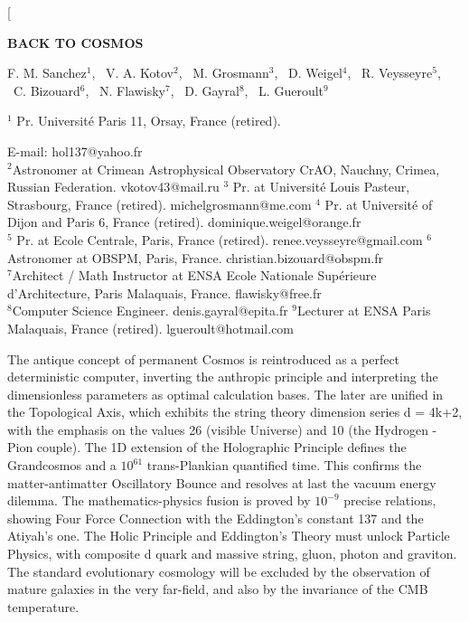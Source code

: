 \documentclass[twoside,draft]{article}
\begin{document}
\begin{sloppypar}

\renewcommand{\refname}{References}
\renewcommand{\tablename}{\small Table}
\renewcommand{\figurename}{\small Fig.}
\renewcommand{\contentsname}{Contents}


\twocolumn[%
\begin{center}
\renewcommand{\baselinestretch}{0.93}
{\Large\bfseries BACK TO COSMOS

}\par
\renewcommand{\baselinestretch}{1.0}
\bigskip
F. M. Sanchez$^1\!$, \ V. A. Kotov$^2\!$, \ M. Grosmann$^3$, \ D. Weigel$^4$, \ R. Veysseyre$^5$,\\ \ C. Bizouard$^6$, \ N. Flawisky$^7$, \ D. Gayral$^8$, \ L. Gueroult$^9$\\
{\footnotesize  $^1$ Pr. Universit\'{e} Paris 11, Orsay, France (retired).\rule{0pt}{12pt}
E-mail: hol137@yahoo.fr\\
$^2$Astronomer at Crimean Astrophysical Observatory CrAO, Nauchny, Crimea, Russian Federation. vkotov43@mail.ru
$^3$ Pr. at Universit\'{e} Louis Pasteur, Strasbourg, France (retired). michelgrosmann@me.com
$^4$ Pr. at Universit\'{e} of Dijon and Paris 6, France (retired). dominique.weigel@orange.fr
\\ $^5$ Pr. at Ecole Centrale, Paris, France (retired). renee.veysseyre@gmail.com
$^6$Astronomer at OBSPM, Paris, France. christian.bizouard@obspm.fr
\\ $^7$Architect / Math Instructor at ENSA Ecole Nationale Sup\'{e}rieure d'Architecture, Paris Malaquais, France. flawisky@free.fr
\\$^8$Computer Science Engineer. denis.gayral@epita.fr
$^9$Lecturer at ENSA Paris Malaquais, France (retired). lgueroult@hotmail.com

}\par
\medskip
{\small\parbox{11cm}{%


The antique concept of permanent Cosmos is reintroduced as a perfect deterministic computer, inverting the anthropic principle and interpreting the dimensionless parameters as optimal calculation bases. The later are unified in the Topological Axis, which exhibits the string theory dimension series d = 4k+2, with the emphasis on the values 26 (visible Universe) and 10 (the Hydrogen - Pion couple). The 1D extension of the Holographic Principle defines the Grandcosmos and a $10^{61}$ trans-Plankian quantified time. This confirms the matter-antimatter Oscillatory Bounce and resolves at last the vacuum energy dilemma. The mathematics-physics fusion is proved by $10^{-9}$ precise relations, showing Four Force Connection with the Eddington's constant 137 and the Atiyah's one. The Holic Principle and Eddington's Theory must unlock Particle Physics, with composite d quark and massive string, gluon, photon and graviton. The standard evolutionary cosmology will be excluded by the observation of mature galaxies in the very far-field, and also by the invariance of the CMB temperature.  

}}
\end{center}
\end{sloppypar}
\end{document}
